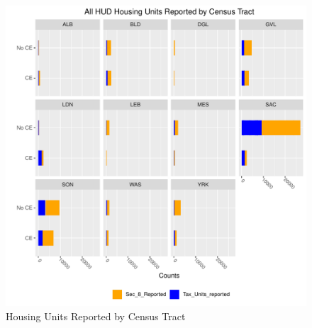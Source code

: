 \documentclass{article}\usepackage[]{graphicx}\usepackage[]{color}
\makeatletter
\def\maxwidth{ %
  \ifdim\Gin@nat@width>\linewidth
    \linewidth
  \else
    \Gin@nat@width
  \fi
}
\newenvironment{knitrout}{}{} %
\makeatother
\begin{document}
\begin{knitrout}
\color{fgcolor}\begin{figure}
\includegraphics[width=\maxwidth]{figure/MultiPlot_All_Units_Counts_stacked-1} \caption[Housing Units Reported by Census Tract]{Housing Units Reported by Census Tract}\label{fig:MultiPlot_All_Units_Counts_stacked}
\end{figure}


\end{knitrout}
\end{document}
